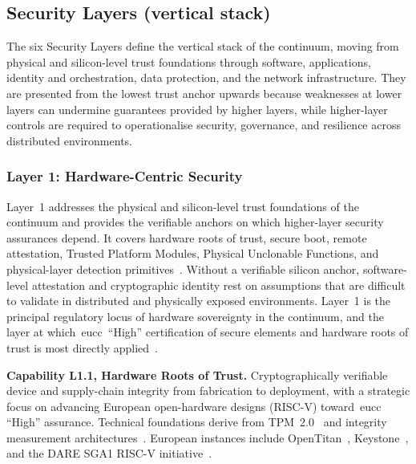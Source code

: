 \documentclass{ieeeaccess}
\begin{document}
\subsection{Security Layers (vertical stack)}

The six Security Layers define the vertical stack of the continuum, moving from physical and silicon-level trust foundations through software, applications, identity and orchestration, data protection, and the network infrastructure. They are presented from the lowest trust anchor upwards because weaknesses at lower layers can undermine guarantees provided by higher layers, while higher-layer controls are required to operationalise security, governance, and resilience across distributed environments.

\subsubsection{Layer 1: Hardware-Centric Security}
\label{sec:L1}

Layer~1 addresses the physical and silicon-level trust foundations of the continuum and provides the verifiable anchors on which higher-layer security assurances depend. It covers hardware roots of trust, secure boot, remote attestation, Trusted Platform Modules, Physical Unclonable Functions, and physical-layer detection primitives~\cite{tpm2spec,sailer2004}. Without a verifiable silicon anchor, software-level attestation and cryptographic identity rest on assumptions that are difficult to validate in distributed and physically exposed environments. Layer~1 is the principal regulatory locus of hardware sovereignty in the continuum, and the layer at which~\gls{eucc}~``High'' certification of secure elements and hardware roots of trust is most directly applied~\cite{commreg2024eucc}.

\textbf{Capability L1.1, Hardware Roots of Trust.} Cryptographically verifiable device and supply-chain integrity from fabrication to deployment, with a strategic focus on advancing European open-hardware designs (RISC-V) toward~\gls{eucc} ``High'' assurance. Technical foundations derive from TPM~2.0~\cite{tpm2spec} and integrity measurement architectures~\cite{sailer2004}. European instances include OpenTitan~\cite{opentitan2024}, Keystone~\cite{keystone2020}, and the DARE SGA1 RISC-V initiative~\cite{eurohpcdare2025}.
\end{document}
